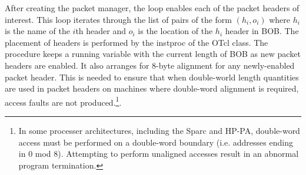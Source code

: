 \label{sec:configupacket}
After creating the packet manager, the 
loop enables each of the packet headers of interest.
This loop iterates through the list of pairs of the form
$(h_i, o_i)$ where $h_i$ is the name of the  $i$th header
and $o_i$ is the location of the $h_i$ header in BOB.
The placement of headers is performed by the 
instproc of the  OTcl class.
The procedure keeps a running variable  with
the current length of BOB as new packet headers are enabled.
It also arranges for 8-byte alignment for any newly-enabled packet
header.
This is needed to ensure that when double-world length quantities
are used in packet headers on machines where double-word alignment
is required, access faults are not produced.\footnote{In
some processer architectures, including the
Sparc and HP-PA, double-word access must be performed on a double-word
boundary (i.e. addresses ending in 0 mod 8).  Attempting to perform
unaligned accesses result in an abnormal program termination.}.
